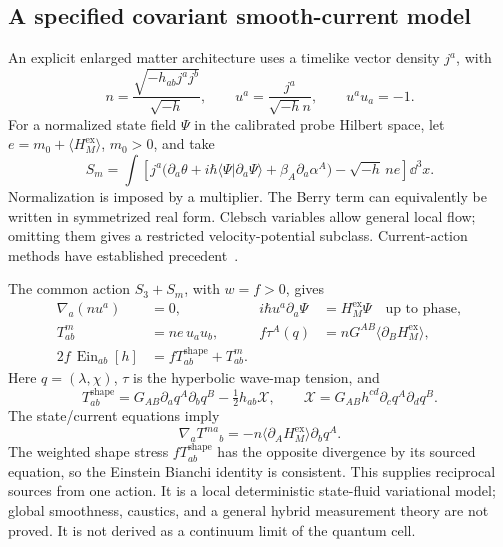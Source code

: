 \documentclass[11pt]{article}
\begin{document}
\subsection{A specified covariant smooth-current model}
An explicit enlarged matter architecture uses a timelike vector density $j^a$, with
\[
n=\frac{\sqrt{-h_{ab}j^aj^b}}{\sqrt{-h}},\qquad
u^a=\frac{j^a}{\sqrt{-h}n},\qquad u^au_a=-1.
\]
For a normalized state field $\Psi$ in the calibrated probe Hilbert space, let $e=m_0+\langle H_M^{\mathrm{ex}}\rangle$, $m_0>0$, and take
\begin{equation}\label{eq:fluid}
S_m=\int\left[j^a\big(\partial_a\theta+i\hbar\langle\Psi|\partial_a\Psi\rangle
+\beta_A\partial_a\alpha^A\big)-\sqrt{-h}\,ne\right]\dd^3x.
\end{equation}
Normalization is imposed by a multiplier. The Berry term can equivalently be written in symmetrized real form. Clebsch variables allow general local flow; omitting them gives a restricted velocity-potential subclass. Current-action methods have established precedent~\cite{Brown}.

The common action $S_3+S_m$, with $w=f>0$, gives
\begin{align}
\nabla_a(nu^a)&=0,& i\hbar u^a\partial_a\Psi&=H_M^{\mathrm{ex}}\Psi
\quad\text{up to phase},\\
T^{m}_{ab}&=ne\,u_au_b,&f\tau^A(q)&=nG^{AB}\langle\partial_BH_M^{\mathrm{ex}}\rangle,\label{eq:sourcestress}\\
2f\,\operatorname{Ein}_{ab}[h]&=fT^{\mathrm{shape}}_{ab}+T^m_{ab}.&&
\end{align}
Here $q=(\lambda,\chi)$, $\tau$ is the hyperbolic wave-map tension, and
\[
T^{\mathrm{shape}}_{ab}=G_{AB}\partial_aq^A\partial_bq^B-\tfrac12h_{ab}\mathcal X,
\qquad\mathcal X=G_{AB}h^{cd}\partial_cq^A\partial_dq^B.
\]
The state/current equations imply
\begin{equation}\label{eq:ward}
\nabla_aT^{ma}{}_b=-n\langle\partial_AH_M^{\mathrm{ex}}\rangle\partial_bq^A.
\end{equation}
The weighted shape stress $fT^{\mathrm{shape}}_{ab}$ has the opposite divergence by its sourced equation, so the Einstein Bianchi identity is consistent. This supplies reciprocal sources from one action. It is a local deterministic state-fluid variational model; global smoothness, caustics, and a general hybrid measurement theory are not proved. It is not derived as a continuum limit of the quantum cell.
\end{document}
